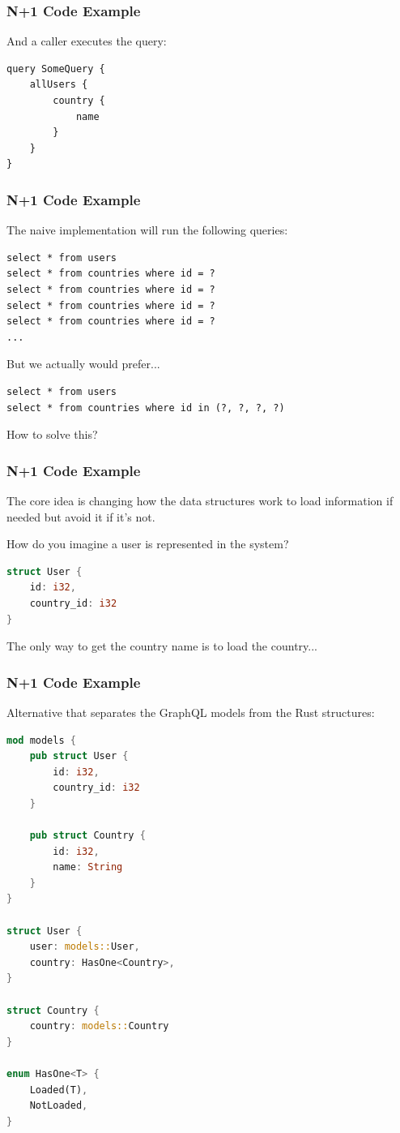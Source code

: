 \begin{frame}[fragile]
\frametitle{N+1 Code Example}

And a caller executes the query:
\begin{lstlisting}
query SomeQuery {
    allUsers {
        country {
            name
        }
    }
}
\end{lstlisting}

\end{frame}
\begin{frame}[fragile]
\frametitle{N+1 Code Example}

The naive implementation will run the following queries:
\begin{lstlisting}
select * from users
select * from countries where id = ?
select * from countries where id = ?
select * from countries where id = ?
select * from countries where id = ?
...
\end{lstlisting}

But we actually would prefer...
\begin{lstlisting}
select * from users
select * from countries where id in (?, ?, ?, ?)
\end{lstlisting}

How to solve this?


\end{frame}

\begin{frame}[fragile]
\frametitle{N+1 Code Example}

The core idea is changing how the data structures work to load information if needed but avoid it if it's not.

How do you imagine a user is represented in the system?
\begin{lstlisting}[language=Rust]
struct User {
    id: i32,
    country_id: i32
}
\end{lstlisting}

The only way to get the country name is to load the country...

\end{frame}

\begin{frame}[fragile]
\frametitle{N+1 Code Example}
Alternative that separates the GraphQL models from the Rust structures:

\begin{lstlisting}[language=Rust]
mod models {
    pub struct User {
        id: i32,
        country_id: i32
    }

    pub struct Country {
        id: i32,
        name: String
    }
}

struct User {
    user: models::User,
    country: HasOne<Country>,
}

struct Country {
    country: models::Country
}

enum HasOne<T> {
    Loaded(T),
    NotLoaded,
}
\end{lstlisting}


\end{frame}

